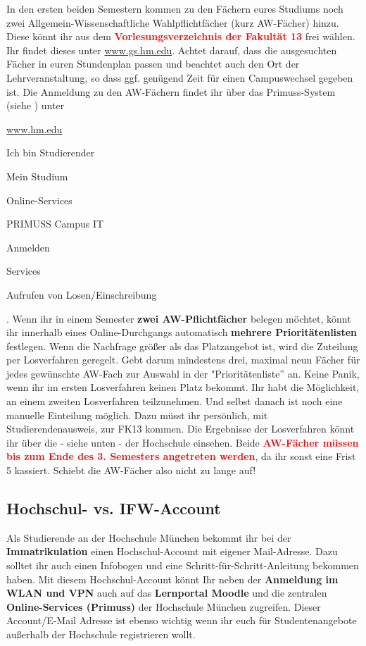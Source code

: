 In den ersten beiden Semestern kommen zu den Fächern eures Studiums noch zwei Allgemein-Wissenschaftliche Wahlpflichtfächer (kurz AW-Fächer) hinzu. Diese könnt ihr aus dem \textcolor{red}{\textbf{Vorlesungsverzeichnis der Fakultät 13}} frei wählen. Ihr findet dieses unter \url{www.gs.hm.edu}. Achtet darauf, dass die ausgesuchten Fächer in euren Stundenplan passen und beachtet auch den Ort der Lehrveranstaltung, so dass ggf. genügend Zeit für einen Campuswechsel gegeben ist.\doublebreak
Die Anmeldung zu den AW-Fächern findet ihr über das Primuss-System (siehe ) unter
\begin{sitenav}
	\item \url{www.hm.edu}
	\item Ich bin Studierender
	\item Mein Studium
	\item Online-Services
	\item PRIMUSS Campus IT
	\item Anmelden
	\item Services
	\item Aufrufen von Losen/Einschreibung
\end{sitenav}.\doublebreak
Wenn ihr in einem Semester \textbf{zwei AW-Pflichtfächer} belegen möchtet, könnt ihr innerhalb eines Online-Durchgangs automatisch \textbf{mehrere Prioritätenlisten} festlegen. Wenn die Nachfrage größer als das Platzangebot ist, wird die Zuteilung per Losverfahren geregelt. Gebt darum mindestens drei, maximal neun Fächer für jedes gewünschte AW-Fach zur Auswahl in der "Prioritätenliste'' an. Keine Panik, wenn ihr im ersten Losverfahren keinen Platz bekommt. Ihr habt die Möglichkeit, an einem zweiten Losverfahren teilzunehmen. Und selbst danach ist noch eine manuelle Einteilung möglich. Dazu müsst ihr persönlich, mit Studierendenausweis, zur FK13 kommen.\doublebreak
Die Ergebnisse der Losverfahren könnt ihr über die  - siehe unten - der Hochschule einsehen.\doublebreak
Beide \textcolor{red}{\textbf{AW-Fächer müssen bis zum Ende des 3. Semesters angetreten werden}}, da ihr sonst eine Frist 5 kassiert. Schiebt die AW-Fächer also nicht zu lange auf! 

\subsection{Hochschul- vs. IFW-Account}

Als Studierende an der Hochschule München bekommt ihr bei der \textbf{Immatrikulation} einen Hochschul-Account mit eigener Mail-Adresse. Dazu solltet ihr auch einen Infobogen und eine Schritt-für-Schritt-Anleitung bekommen haben.\doublebreak
Mit diesem Hochschul-Account könnt Ihr neben der \textbf{Anmeldung im WLAN und VPN} auch auf das \textbf{Lernportal Moodle} und die zentralen \textbf{Online-Services (Primuss)} der Hochschule München zugreifen. Dieser Account/E-Mail Adresse ist ebenso wichtig wenn ihr euch für Studentenangebote außerhalb der Hochschule registrieren wollt.

